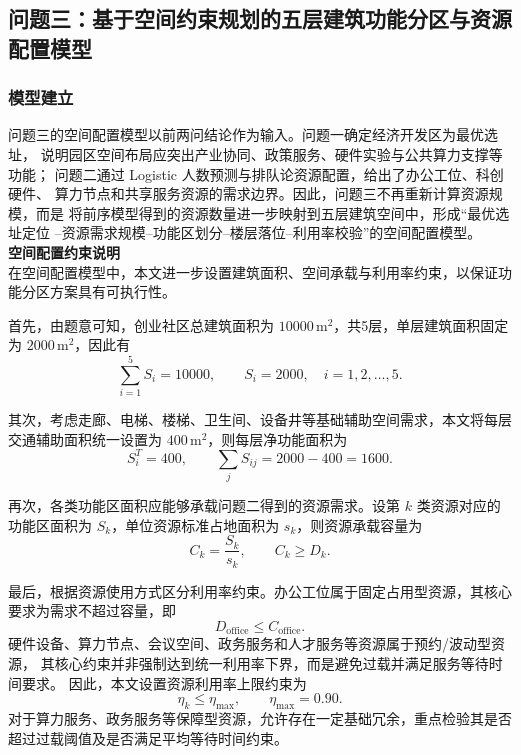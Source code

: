 \documentclass[12pt,a4paper]{article}
\begin{document}
\subsection{问题三：基于空间约束规划的五层建筑功能分区与资源配置模型}
\subsubsection{模型建立}
问题三的空间配置模型以前两问结论作为输入。问题一确定经济开发区为最优选址， 说明园区空间布局应突出产业协同、政策服务、硬件实验与公共算力支撑等功能； 问题二通过 Logistic 人数预测与排队论资源配置，给出了办公工位、科创硬件、 算力节点和共享服务资源的需求边界。因此，问题三不再重新计算资源规模，而是 将前序模型得到的资源数量进一步映射到五层建筑空间中，形成“最优选址定位 --资源需求规模--功能区划分--楼层落位--利用率校验”的空间配置模型。\\
\vspace{1em}\textbf{空间配置约束说明}\\
在空间配置模型中，本文进一步设置建筑面积、空间承载与利用率约束，以保证功能分区方案具有可执行性。

首先，由题意可知，创业社区总建筑面积为 $10000\,\mathrm{m^2}$，共5层，单层建筑面积固定为 $2000\,\mathrm{m^2}$，因此有
\begin{equation}
\sum_{i=1}^{5}S_i=10000,\qquad S_i=2000,\quad i=1,2,\ldots,5.
\end{equation}

其次，考虑走廊、电梯、楼梯、卫生间、设备井等基础辅助空间需求，本文将每层交通辅助面积统一设置为 $400\,\mathrm{m^2}$，则每层净功能面积为
\begin{equation}
S_i^{T}=400,\qquad \sum_{j}S_{ij}=2000-400=1600.
\end{equation}

再次，各类功能区面积应能够承载问题二得到的资源需求。设第 $k$ 类资源对应的功能区面积为 $S_k$，单位资源标准占地面积为 $s_k$，则资源承载容量为
\begin{equation}
C_k=\frac{S_k}{s_k},\qquad C_k\geq D_k.
\end{equation}

最后，根据资源使用方式区分利用率约束。办公工位属于固定占用型资源，其核心要求为需求不超过容量，即
\begin{equation}
D_{\mathrm{office}}\leq C_{\mathrm{office}}.
\end{equation}
硬件设备、算力节点、会议空间、政务服务和人才服务等资源属于预约/波动型资源，
其核心约束并非强制达到统一利用率下界，而是避免过载并满足服务等待时间要求。
因此，本文设置资源利用率上限约束为
\begin{equation}
\eta_k \leq \eta_{\max}, \qquad \eta_{\max}=0.90 .
\end{equation}
对于算力服务、政务服务等保障型资源，允许存在一定基础冗余，重点检验其是否超过过载阈值及是否满足平均等待时间约束。
\end{document}
